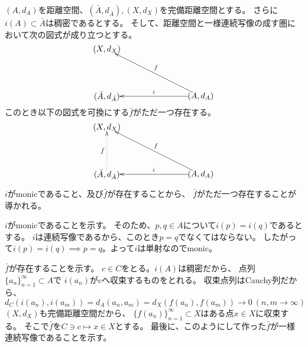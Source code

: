 \documentclass[a4jpaper]{jarticle}
\newcommand{\compA}{\bar{A}}
\begin{document}
\begin{Them}
    $(A, d_A)$を距離空間、$(\compA, d_{\compA}), (X, d_X)$を完備距離空間とする。
    さらに$i(A) \subset \compA$は稠密であるとする。
    そして、距離空間と一様連続写像の成す圏において次の図式が成り立つとする。
    \[
    \begin{xy}
        (0, 20) *{(X, d_X)}="X",
        (0,0)   *{(\compA, d_{\compA})}="C",
        (40, 0) *{(A, d_A)}="A",
        \ar_{f} "A";"X"
        \ar_{i} "A";"C"
    \end{xy}
    \]
    このとき以下の図式を可換にする$\bar{f}$がただ一つ存在する。
    \[
    \begin{xy}
        (0, 20) *{(X, d_X)}="X",
        (0,0)   *{(\compA, d_{\compA})}="C",
        (40, 0) *{(A, d_A)}="A",
        \ar_{f} "A";"X"
        \ar_{i} "A";"C"
        {\ar@{.>}^{\bar{f}} "C";"X"}
    \end{xy}
    \]
\end{Them}

\begin{Proof}
    $i$がmonicであること、及び$\bar{f}$が存在することから、
    $\bar{f}$がただ一つ存在することが導かれる。

    $i$がmonicであることを示す。
    そのため、$p, q \in A$について$i(p)=i(q)$であるとする。
    $i$は連続写像であるから、このとき$p=q$でなくてはならない。
    したがって$i(p)=i(q) \implies p=q$。よって$i$は単射なのでmonic。

    $\bar{f}$が存在することを示す。
    $c \in C$をとる。$i(A)$は稠密だから、
    点列$\{ a_n \}_{n=1}^{\infty} \subset A$で
    $i(a_n)$が$c$へ収束するものをとれる。
    収束点列はCauchy列だから、
    \[
        d_C(i(a_n), i(a_m))=d_A(a_n, a_m)=d_X(f(a_n), f(a_m))
        \to 0 ~(n, m \to \infty)
    \]
    $(X, d_X)$も完備距離空間だから、
    $\{ f(a_n) \}_{n=1}^{\infty} \subset X$はある点$x \in X$に収束する。
    そこで$\bar{f}$を$C \ni c \mapsto x \in X$とする。
    最後に、このようにして作った$\bar{f}$が一様連続写像であることを示す。


    \QED
\end{Proof}
\end{document}
